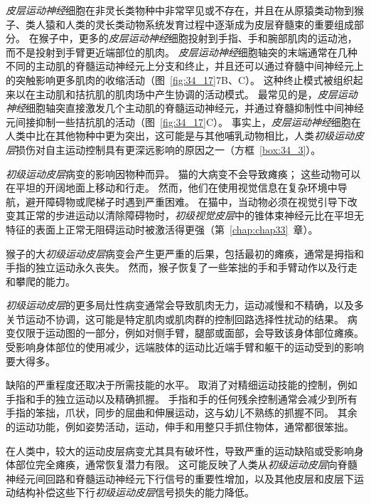 \textit{皮层运动神经}细胞在非灵长类物种中非常罕见或不存在，并且在从原猿类动物到猴子、类人猿和人类的灵长类动物系统发育过程中逐渐成为皮层脊髓束的重要组成部分。
在猴子中，更多的\textit{皮层运动神经}细胞投射到手指、手和腕部肌肉的运动池，而不是投射到手臂更近端部位的肌肉。
\textit{皮层运动神经}细胞轴突的末端通常在几种不同的主动肌的脊髓运动神经元上分支和终止，并且还可以通过脊髓中间神经元上的突触影响更多肌肉的收缩活动（图~\ref{fig:34_17}7B、C）。
这种终止模式被组织起来以在主动肌和拮抗肌的肌肉场中产生协调的活动模式。
最常见的是，\textit{皮层运动神经}细胞轴突直接激发几个主动肌的脊髓运动神经元，并通过脊髓抑制性中间神经元间接抑制一些拮抗肌的活动（图~\ref{fig:34_17}C）。
事实上，\textit{皮层运动神经}细胞在人类中比在其他物种中更为突出，这可能是与其他哺乳动物相比，人类\textit{初级运动皮层}损伤对自主运动控制具有更深远影响的原因之一（方框~\ref{box:34_3}）。



\begin{proposition}[初级运动皮层的损伤导致运动执行障碍] \label{box:34_3}
	
	\quad \quad \textit{初级运动皮层}病变的影响因物种而异。
	猫的大病变不会导致瘫痪；
	这些动物可以在平坦的开阔地面上移动和行走。
	然而，他们在使用视觉信息在复杂环境中导航，避开障碍物或爬梯子时遇到严重困难。
	在猫中，当动物必须在视觉引导下改变其正常的步进运动以清除障碍物时，\textit{初级视觉皮层}中的锥体束神经元比在平坦无特征的表面上正常无阻碍运动时被激活得更强（第~\ref{chap:chap33}~章）。
	
	\quad \quad 猴子的大\textit{初级运动皮层}病变会产生更严重的后果，包括最初的瘫痪，通常是拇指和手指的独立运动永久丧失。
	然而，猴子恢复了一些笨拙的手和手臂动作以及行走和攀爬的能力。
	
	\quad \quad \textit{初级运动皮层}的更多局灶性病变通常会导致肌肉无力，运动减慢和不精确，以及多关节运动不协调，这可能是特定肌肉或肌肉群的控制回路选择性扰动的结果。
	病变仅限于运动图的一部分，例如对侧手臂，腿部或面部，会导致该身体部位瘫痪。
	受影响身体部位的使用减少，远端肢体的运动比近端手臂和躯干的运动受到的影响要大得多。
	
	\quad \quad 缺陷的严重程度还取决于所需技能的水平。
	取消了对精细运动技能的控制，例如手指和手的独立运动以及精确抓握。
	手指和手的任何残余控制通常会减少到所有手指的笨拙，爪状，同步的屈曲和伸展运动，这与幼儿不熟练的抓握不同。
	其余的运动功能，例如姿势活动，运动，伸手和用整只手抓住物体，通常都很笨拙。
	
	\quad \quad 在人类中，较大的运动皮层病变尤其具有破坏性，导致严重的运动缺陷或受影响身体部位完全瘫痪，通常恢复潜力有限。
	这可能反映了人类从\textit{初级运动皮层}向脊髓神经元间回路和脊髓运动神经元下行信号的重要性增加，以及其他皮层和皮层下运动结构补偿这些下行\textit{初级运动皮层}信号损失的能力降低。
	
\end{proposition}


